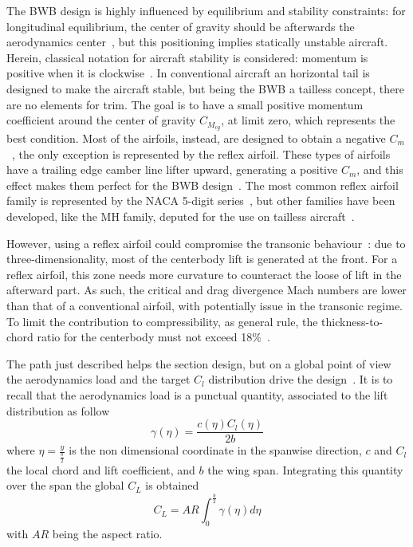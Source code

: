 The BWB design is highly influenced by equilibrium and stability constraints: for longitudinal equilibrium, the center of gravity should be afterwards the aerodynamics center~\cite{bib:anderson_perfo}, but this positioning implies statically unstable aircraft.
Herein, classical notation for aircraft stability is considered: momentum is positive when it is clockwise~\cite{bib:roskam_perfo, bib:roskam_flight_dynamics}. 
In conventional aircraft an horizontal tail is designed to make the aircraft stable, but being the BWB a tailless concept, there are no elements for trim. 
The goal is to have a small positive momentum coefficient around the center of gravity $C_{M_{cg}}$, at limit zero, which represents the best condition. 
Most of the airfoils, instead, are designed to obtain a negative $C_m$~\cite{bib:abbott}, the only exception is represented by the reflex airfoil. 
These types of airfoils have a trailing edge camber line lifter upward, generating a positive $C_m$, and this effect makes them perfect for the BWB design~\cite{bib:alex, bib:wang}.
The most common reflex airfoil family is represented by the NACA 5-digit series~\cite{bib:abbott}, but other families have been developed, like the MH family, deputed for the use on tailless aircraft~\cite{bib:mh_airfoiltool, bib:eppler}. 

However, using a reflex airfoil could compromise the transonic behaviour~\cite{bib:sargeant}: due to three-dimensionality, most of the centerbody lift is generated at the front.
For a reflex airfoil, this zone needs more curvature to counteract the loose of lift in the afterward part. 
As such, the critical and drag divergence Mach numbers are lower than that of a conventional airfoil, with potentially issue in the transonic regime. 
To limit the contribution to compressibility, as general rule, the thickness-to-chord ratio for the centerbody must not exceed 18\%~\cite{bib:kozek, bib:ikeda}.

The path just described helps the section design, but on a global point of view the aerodynamics load and the target $C_l$ distribution drive the design~\cite{bib:anderson_perfo}. 
It is to recall that the aerodynamics load is a punctual quantity, associated to the lift distribution as follow
\begin{equation}
	\label{eq:aero_load}
	\gamma\left(\eta\right) = \frac{c\left(\eta\right)C_l\left(\eta\right)}{2b}
\end{equation}
where $\eta=\frac{y}{\frac{b}{2}}$ is the non dimensional coordinate in the spanwise direction, $c$ and $C_l$ the local chord and lift coefficient, and $b$ the wing span. 
Integrating this quantity over the span the global $C_L$ is obtained
\begin{equation}
	\label{eq:global_cl_aero_load}
	C_L=AR\int_{0}^{\frac{b}{2}}\gamma\left(\eta\right)d\eta
\end{equation}
with $AR$ being the aspect ratio. 

